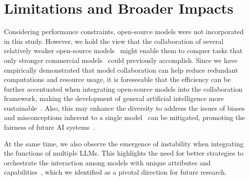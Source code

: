 \section{Limitations and Broader Impacts}

Considering performance constraints, 
open-source models were not incorporated in this study. 
However,
we hold the view that the collaboration of several relatively weaker open-source models~\citep{zhang2022opt, touvron2023llama2} might enable them to conquer tasks that only stronger commercial models~\citep{bai2022training, openai2023gpt4} could previously accomplish.
Since we have empirically demonstrated that model collaboration can help reduce redundant computations and resource usage, 
it is foreseeable that the efficiency can be further accentuated when integrating open-source models into the collaboration framework, making the development of general artificial intelligence more sustainable~\citep{hessenthaler2022bridging}.
Also,
this may enhance the diversity to address the issues of biases and misconceptions inherent to a single model~\citep{sun2022bertscore, shaikh2023second} can be mitigated, 
promoting the fairness of future AI systems~\citep{hendrycks2021aligning}.

At the same time, 
we also observe the emergence of instability when integrating the functions of multiple LLMs.
This highlights the need for better strategies to orchestrate the interaction among models with unique attributes and capabilities~\citep{parsons2003arg, dorri2018agentsurvey}, %
which we identified as a pivotal direction for future research.








